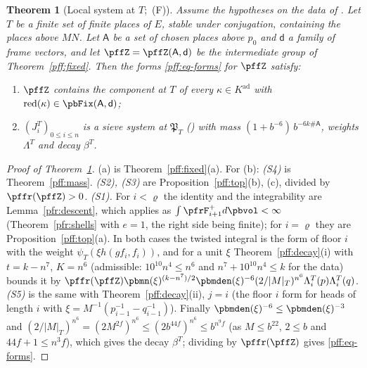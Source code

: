 \documentclass[10pt]{amsart}
\newtheorem{theorem}{Theorem}[section]
\theoremstyle{definition}
\theoremstyle{remark}
\begin{document}
\begin{theorem}[Local system at $T$; {\cite[Theorem~3.51]{P51}}\,\textup{(F)}]\label{pff:F}
Assume the hypotheses on the data of {\cite[Theorem~3.53]{P51}}. Let $T$ be a finite set of finite places
of $E$, stable under conjugation, containing the places above $MN$. Let $\mathsf A$ be a set of
chosen places above $p_0$ and $\mathsf d$ a family of frame vectors, and let $\pffZ=\pffZ(\mathsf A,
\mathsf d)$ be the intermediate group of Theorem~\ref{pff:fixed}. Then the forms
\eqref{pff:eq-forms} for $\pffZ$ satisfy:
\begin{enumerate}
\item[(a)] $\pffZ$ contains the component at $T$ of every $\kappa\in K^{\mathrm{ad}}$ with
$\mathrm{red}(\kappa)\in\pbFix(\mathsf A,\mathsf d)$;
\item[(b)] $(J^T_i)_{0\le i\le n}$ is a sieve system at $\mathfrak P_T$
({\cite[Definition~3.44]{P51}}) with mass $(1+b^{-6})\,b^{-6k\#\mathsf A}$, weights $\Lambda^T$ and
decay $\beta^T$.
\end{enumerate}
\end{theorem}

\begin{proof}[Proof of Theorem~\ref{pff:F}]
(a) is Theorem~\ref{pff:fixed}(a). For (b): \emph{(S4)} is Theorem~\ref{pff:mass}.
\emph{(S2), (S3)} are Proposition~\ref{pff:top}(b), (c), divided by $\pffr(\pffZ)>0$.
\emph{(S1).} For $i<\varrho$ the identity and the integrability are Lemma~\ref{pfr:descent}, which
applies as $\int\pfrF^+_{i+1}d\pbvol<\infty$ (Theorem~\ref{pfr:shells} with $e=1$, the right side being
finite); for $i=\varrho$ they are Proposition~\ref{pff:top}(a). In both cases the twisted integral is the
form of floor $i$ with the weight $\psi_T(\xi h(gf_i,f_i))$, and for a unit $\xi$
Theorem~\ref{pff:decay}(i) with $t=k-n^7$, $K=n^6$ (admissible: $10^{10}n^4\le n^6$ and $n^7+10^{10}n^4\le
k$ for the data) bounds it by $\pffr(\pffZ)\pbmn(\xi)^{(k-n^7)/2}\pbmden(\xi)^{-6}(2/|M|_T)^{n^6}
\Lambda^T_i(p)\Lambda^T_i(q)$. \emph{(S5)} is the same with Theorem~\ref{pff:decay}(ii), $j=i$ (the floor
$i$ form for heads of length $i$ with $\xi=M^{-1}(p_{i-1}^{-1}-q_{i-1}^{-1})$). Finally $\pbmden(\xi)^{-6}\le
\pbmden(\xi)^{-3}$ and $(2/|M|_T)^{n^6}=(2M^{2f})^{n^6}\le(2b^{44f})^{n^6}\le b^{n^9f}$ (as $M\le b^{22}$,
$2\le b$ and $44f+1\le n^3f$), which gives the decay $\beta^T$; dividing by $\pffr(\pffZ)$ gives
\eqref{pff:eq-forms}.
\end{proof}
\end{document}

